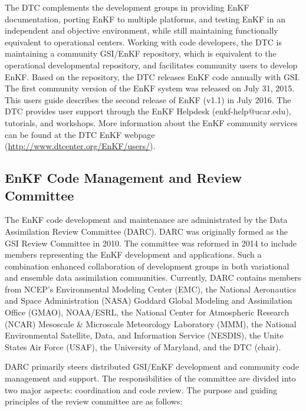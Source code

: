 The DTC complements the development groups in providing EnKF documentation, porting EnKF to multiple platforms, and testing EnKF in an independent and objective environment, while still maintaining functionally equivalent to operational centers. Working with code developers, the DTC is maintaining a community GSI/EnKF repository, which is equivalent to the operational developmental repository, and facilitates community users to develop  EnKF. Based on the repository, the DTC releases EnKF code annually with GSI. The first community version of the EnKF system was released on July 31, 2015. This user\textquotesingle s guide describes the second release of EnKF (v1.1) in July 2016. The DTC provides user support through the EnKF Helpdesk (enkf-help@ucar.edu), tutorials, and workshops. More information about the EnKF community services can be found at the DTC EnKF webpage (\url{http://www.dtcenter.org/EnKF/users/}).

\subsection{EnKF Code Management and Review Committee}

The EnKF code development and maintenance are administrated by the Data Assimilation Review Committee (DARC). DARC was originally formed as the GSI Review Committee in 2010. The committee was reformed in 2014 to include members representing the EnKF development and applications. Such a combination enhanced collaboration of development groups in both variational and ensemble data assimilation communities. 
Currently, DARC contains members from NCEP's Environmental Modeling Center (EMC), the National Aeronautics and Space Administration (NASA) Goddard Global Modeling and Assimilation Office (GMAO), NOAA/ESRL, the National Center for Atmospheric Research (NCAR) Mesoscale \& Microscale Meteorology Laboratory (MMM), the National Environmental Satellite, Data, and Information Service (NESDIS), the Unite States Air Force (USAF), the University of Maryland, and the DTC (chair).

DARC primarily steers distributed GSI/EnKF development and community code management and support. The responsibilities of the committee are divided into two major aspects: coordination and code review. The purpose and guiding principles of the review committee are as follows:

